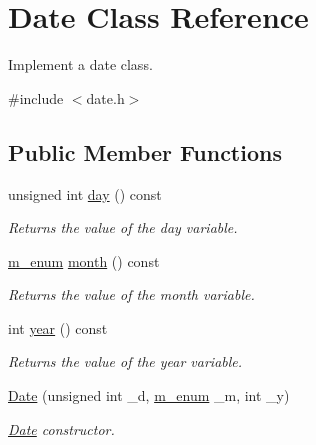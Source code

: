 \hypertarget{class_date}{}\section{Date Class Reference}
\label{class_date}


Implement a date class.  




{\ttfamily \#include $<$date.\+h$>$}

\subsection*{Public Member Functions}
\begin{DoxyCompactItemize}
\item 
\mbox{\label{class_date_a38b18986a934a931bcef3979697aa871}} 
unsigned int \hyperlink{class_date_a38b18986a934a931bcef3979697aa871}{day} () const
\begin{DoxyCompactList}\small\item\em Returns the value of the day variable. \end{DoxyCompactList}\item 
\mbox{\label{class_date_a71889264c9f704db5a6e515f0739026e}} 
\hyperlink{date_8h_a674553c60dd4ed7297e6c18d8139e067}{m\+\_\+enum} \hyperlink{class_date_a71889264c9f704db5a6e515f0739026e}{month} () const
\begin{DoxyCompactList}\small\item\em Returns the value of the month variable. \end{DoxyCompactList}\item 
\mbox{\label{class_date_adb59de8d1ac3b04cbd57be3b551be2dc}} 
int \hyperlink{class_date_adb59de8d1ac3b04cbd57be3b551be2dc}{year} () const
\begin{DoxyCompactList}\small\item\em Returns the value of the year variable. \end{DoxyCompactList}\item 
\mbox{\label{class_date_a038ecf65e8734086f8df30659f770cc2}} 
\hyperlink{class_date_a038ecf65e8734086f8df30659f770cc2}{Date} (unsigned int \+\_\+d, \hyperlink{date_8h_a674553c60dd4ed7297e6c18d8139e067}{m\+\_\+enum} \+\_\+m, int \+\_\+y)
\begin{DoxyCompactList}\small\item\em \hyperlink{class_date}{Date} constructor. \end{DoxyCompactList}\item 

\end{DoxyCompactItemize}
